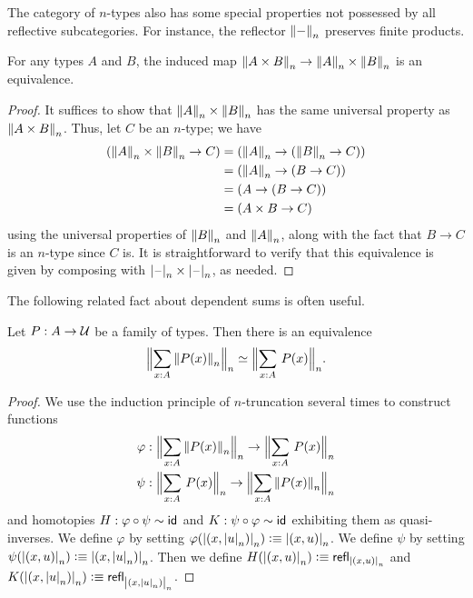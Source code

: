 The category of $n$-types also has some special properties not possessed by all reflective subcategories.
For instance, the reflector $\trunc n-$ preserves finite products.

\begin{thm}\label{cor:trunc-prod}
  For any types $A$ and $B$, the induced map $\trunc n{A\times B} \to \trunc nA \times \trunc nB$ is an equivalence.
\end{thm}
\begin{proof}
  It suffices to show that $\trunc nA \times \trunc nB$ has the same universal property as $\trunc n{A\times B}$.
  Thus, let $C$ be an $n$-type; we have
  \begin{align*}
    (\trunc nA \times \trunc nB \to C)
    &= (\trunc nA \to (\trunc nB \to C))\\
    &= (\trunc nA \to (B \to C))\\
    &= (A \to (B \to C))\\
    &= (A \times B \to C)
  \end{align*}
  using the universal properties of $\trunc nB$ and $\trunc nA$, along with the fact that $B\to C$ is an $n$-type since $C$ is.
  It is straightforward to verify that this equivalence is given by composing with $\tprojf n \times \tprojf n$, as needed.
\end{proof}

The following related fact about dependent sums is often useful.

\begin{thm}\label{thm:trunc-in-truncated-sigma}
Let $P:A\to\type$ be a family of types. Then there is an equivalence
\begin{equation*}
\eqv{\Trunc n{\sm{x:A}\trunc n{P(x)}}}{\Trunc n{\sm{x:A}P(x)}}.
\end{equation*}
\end{thm}

\begin{proof}
We use the induction principle of $n$-truncation several times to construct
functions
\begin{align*}
\varphi & : \Trunc n{\sm{x:A}\trunc n{P(x)}}\to\Trunc n{\sm{x:A}P(x)}\\
\psi & : \Trunc n{\sm{x:A}P(x)}\to \Trunc n{\sm{x:A} \trunc n{P(x)}}
\end{align*}
and homotopies $H:\varphi\circ\psi\htpy \idfunc$ and $K:\psi\circ\varphi\htpy
\idfunc$ exhibiting them as quasi-inverses.
We define $\varphi$ by setting $\varphi(\tproj n{\pairr{x,\tproj nu}})\defeq\tproj n{\pairr{x,u}}$.
We define $\psi$ by setting $\psi(\tproj n{\pairr{x,u}})\defeq\tproj n{\pairr{x,\tproj nu}}$.
Then we define $H(\tproj n{\pairr{x,u}})\defeq \refl{\tproj n{\pairr{x,u}}}$ and
$K(\tproj n{\pairr{x,\tproj nu}})\defeq \refl{\tproj n{\pairr{x,\tproj nu}}}$.
\end{proof}


